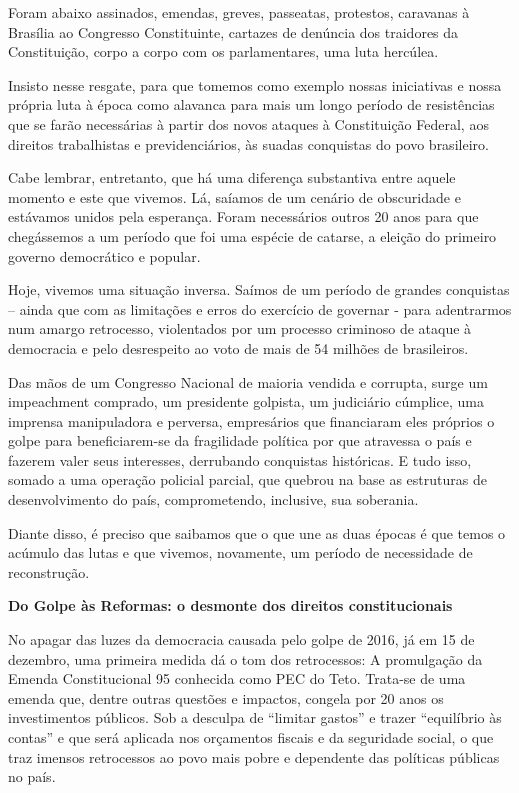 Foram abaixo assinados, emendas, greves, passeatas, protestos, caravanas
à Brasília ao Congresso Constituinte, cartazes de denúncia dos traidores
da Constituição, corpo a corpo com os parlamentares, uma luta hercúlea.

Insisto nesse resgate, para que tomemos como exemplo nossas iniciativas
e nossa própria luta à época como alavanca para mais um longo período de
resistências que se farão necessárias à partir dos novos ataques à
Constituição Federal, aos direitos trabalhistas e previdenciários, às
suadas conquistas do povo brasileiro.

Cabe lembrar, entretanto, que há uma diferença substantiva entre aquele
momento e este que vivemos. Lá, saíamos de um cenário de obscuridade e
estávamos unidos pela esperança. Foram necessários outros 20 anos para
que chegássemos a um período que foi uma espécie de catarse, a eleição
do primeiro governo democrático e popular.

Hoje, vivemos uma situação inversa. Saímos de um período de grandes
conquistas -- ainda que com as limitações e erros do exercício de
governar - para adentrarmos num amargo retrocesso, violentados por um
processo criminoso de ataque à democracia e pelo desrespeito ao voto de
mais de 54 milhões de brasileiros.

Das mãos de um Congresso Nacional de maioria vendida e corrupta, surge
um impeachment comprado, um presidente golpista, um judiciário cúmplice,
uma imprensa manipuladora e perversa, empresários que financiaram eles
próprios o golpe para beneficiarem-se da fragilidade política por que
atravessa o país e fazerem valer seus interesses, derrubando conquistas
históricas. E tudo isso, somado a uma operação policial parcial, que
quebrou na base as estruturas de desenvolvimento do país, comprometendo,
inclusive, sua soberania.

Diante disso, é preciso que saibamos que o que une as duas épocas é que
temos o acúmulo das lutas e que vivemos, novamente, um período de
necessidade de reconstrução.

\textbf{Do Golpe às Reformas: o desmonte dos direitos constitucionais}

No apagar das luzes da democracia causada pelo golpe de 2016, já em 15
de dezembro, uma primeira medida dá o tom dos retrocessos: A promulgação
da Emenda Constitucional 95 conhecida como PEC do Teto. Trata-se de uma
emenda que, dentre outras questões e impactos, congela por 20 anos os
investimentos públicos. Sob a desculpa de ``limitar gastos'' e trazer
``equilíbrio às contas'' e que será aplicada nos orçamentos fiscais e da
seguridade social, o que traz imensos retrocessos ao povo mais pobre e
dependente das políticas públicas no país.

